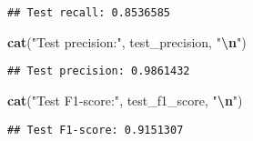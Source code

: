 \documentclass[
]{article}
\newenvironment{Shaded}{\begin{snugshade}}{\end{snugshade}}
\newcommand{\FunctionTok}[1]{\textcolor[rgb]{0.13,0.29,0.53}{\textbf{#1}}}
\newcommand{\NormalTok}[1]{#1}
\newcommand{\SpecialCharTok}[1]{\textcolor[rgb]{0.81,0.36,0.00}{\textbf{#1}}}
\newcommand{\StringTok}[1]{\textcolor[rgb]{0.31,0.60,0.02}{#1}}
\begin{document}
\begin{verbatim}
## Test recall: 0.8536585
\end{verbatim}

\begin{Shaded}
\begin{Highlighting}[]
\FunctionTok{cat}\NormalTok{(}\StringTok{"Test precision:"}\NormalTok{, test\_precision, }\StringTok{"}\SpecialCharTok{\textbackslash{}n}\StringTok{"}\NormalTok{)}
\end{Highlighting}
\end{Shaded}

\begin{verbatim}
## Test precision: 0.9861432
\end{verbatim}

\begin{Shaded}
\begin{Highlighting}[]
\FunctionTok{cat}\NormalTok{(}\StringTok{"Test F1{-}score:"}\NormalTok{, test\_f1\_score, }\StringTok{"}\SpecialCharTok{\textbackslash{}n}\StringTok{"}\NormalTok{)}
\end{Highlighting}
\end{Shaded}

\begin{verbatim}
## Test F1-score: 0.9151307
\end{verbatim}
\end{document}
